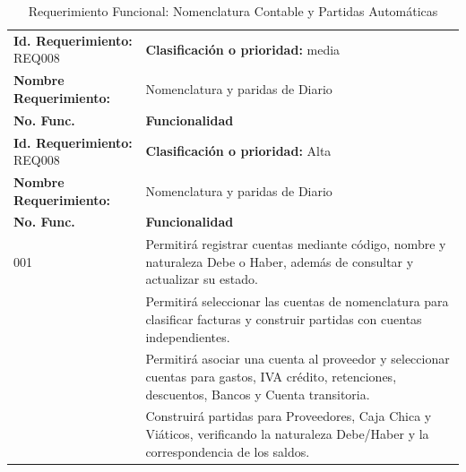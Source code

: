 {
\small
{}
\setlength{\parindent}{0pt}
\begin{xltabular}{\linewidth}{
    >{\raggedright\arraybackslash}p{4.2cm} 
    >{\raggedright\arraybackslash}X
}

    \caption{Requerimiento Funcional: Nomenclatura Contable y Partidas Automáticas} \label{tab:req008_nomenclatura} \\
    \toprule
    \textbf{Id. Requerimiento:} REQ008 & \textbf{Clasificación o prioridad:} media \\
    \textbf{Nombre Requerimiento:} & Nomenclatura y paridas de Diario \\
    \textbf{No. Func.} & \textbf{Funcionalidad} \\
    \midrule
    \endfirsthead

    \toprule
    \textbf{Id. Requerimiento:} REQ008 & \textbf{Clasificación o prioridad:} Alta \\
    \textbf{Nombre Requerimiento:} & Nomenclatura y paridas de Diario \\
    \textbf{No. Func.} & \textbf{Funcionalidad} \\
    \midrule
    \endhead

    \endfoot

    \bottomrule
\endlastfoot

    001 & Permitirá registrar cuentas mediante código, nombre y naturaleza Debe o Haber, además de consultar y actualizar su estado. \\
     & Permitirá seleccionar las cuentas de nomenclatura para clasificar facturas y construir partidas con cuentas independientes. \\
     & Permitirá asociar una cuenta al proveedor y seleccionar cuentas para gastos, IVA crédito, retenciones, descuentos, Bancos y Cuenta transitoria. \\
     & Construirá partidas para Proveedores, Caja Chica y Viáticos, verificando la naturaleza Debe/Haber y la correspondencia de los saldos. \\
\end{xltabular}
}

